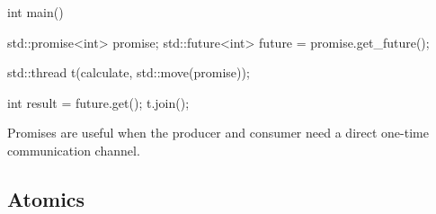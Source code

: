 \documentclass{report}
\begin{document}
\begin{itemize}
\begin{cppcode}
                    int main()
                    {
                        std::promise<int> promise;
                        std::future<int> future = promise.get_future();

                        std::thread t(calculate, std::move(promise));

                        int result = future.get();
                        t.join();
                    }
                \end{cppcode}
                \bigbreak \noindent 
                Promises are useful when the producer and consumer need a direct one-time communication channel.



    \end{itemize}


    \pagebreak 
    \subsection{Atomics}
\end{document}

